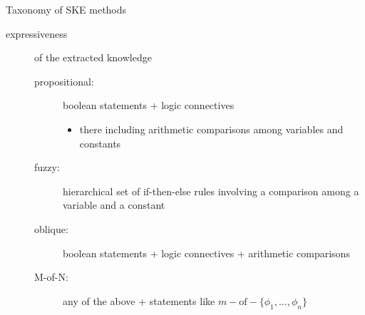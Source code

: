 \documentclass[presentation]{beamer}\mode<presentation>{\usetheme{AMSBolognaFC}}
\begin{document}
\begin{frame}[allowframebreaks]{Taxonomy of SKE methods}
\begin{description}
        \framebreak

        \item[expressiveness] of the extracted knowledge
        \begin{description}
            \item[propositional:] boolean statements + logic connectives
            \begin{itemize}
                \item there including arithmetic comparisons among variables and constants
            \end{itemize}

            \item[fuzzy:] hierarchical set of if-then-else rules involving a comparison among a variable and a constant   
            \item[oblique:] boolean statements + logic connectives + arithmetic comparisons
            \item[M-of-N:] any of the above + statements like $m-\text{of}-\{\phi_1, \ldots, \phi_n \}$
        \end{description} 

    \end{description}
\end{frame}
\end{document}
